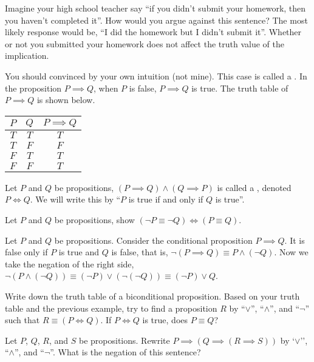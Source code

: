 \documentclass[10pt]{article}
\begin{document}
\begin{example}
    Imagine your high school teacher say ``if you didn't submit your homework, then you haven't completed it''. How would you argue against this sentence? The most likely response would be, ``I did the homework but I didn't submit it''. Whether or not you submitted your homework does not affect the truth value of the implication.
\end{example}
\par
You should convinced by your own intuition (not mine). This case is called a . In the proposition $P\implies Q$, when $P$ is false, $P\implies Q$ is true. The truth table of $P\implies Q$ is shown below.
\begin{center}
    \begin{tabular}{cc|c}
        $P$ & $Q$ & $P\implies Q$ \\
        \hline
        $T$ & $T$ & $T$ \\
        $T$ & $F$ & $F$ \\
        $F$ & $T$ & $T$ \\
        $F$ & $F$ & $T$
    \end{tabular}
\end{center}
\par
Let $P$ and $Q$ be propositions, $(P\implies Q)\wedge(Q\implies P)$ is called a , denoted $P\iff Q$. We will write this by ``$P$ is true if and only if $Q$ is true''.
\begin{problem}
    Let $P$ and $Q$ be propositions, show $(\neg P\equiv\neg Q)\iff(P\equiv Q)$.
\end{problem}
\begin{example}
    Let $P$ and $Q$ be propositions. Consider the conditional proposition $P\implies Q$. It is false only if $P$ is true and $Q$ is false, that is, $\neg(P\implies Q)\equiv P\wedge(\neg Q)$. Now we take the negation of the right side, $\neg(P\wedge(\neg Q))\equiv(\neg P)\vee(\neg(\neg Q))\equiv(\neg P)\vee Q$.
\end{example}
\begin{problem}
    Write down the truth table of a biconditional proposition. Based on your truth table and the previous example, try to find a proposition $R$ by ``$\vee$'', ``$\wedge$'', and ``$\neg$'' such that $R\equiv(P\iff Q)$. If $P\iff Q$ is true, does $P\equiv Q$?
\end{problem}
\begin{problem}
    Let $P$, $Q$, $R$, and $S$ be propositions. Rewrite $P\implies(Q\implies(R\implies S))$ by `$\vee$'', ``$\wedge$'', and ``$\neg$''. What is the negation of this sentence?
\end{problem}
\end{document}

